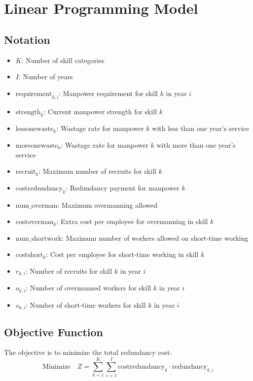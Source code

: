 \documentclass{article}
\begin{document}
\section*{Linear Programming Model}

\subsection*{Notation}
\begin{itemize}
    \item \( K \): Number of skill categories
    \item \( I \): Number of years
    \item \( \text{requirement}_{k,i} \): Manpower requirement for skill \( k \) in year \( i \)
    \item \( \text{strength}_{k} \): Current manpower strength for skill \( k \)
    \item \( \text{lessonewaste}_{k} \): Wastage rate for manpower \( k \) with less than one year's service
    \item \( \text{moreonewaste}_{k} \): Wastage rate for manpower \( k \) with more than one year's service
    \item \( \text{recruit}_{k} \): Maximum number of recruits for skill \( k \)
    \item \( \text{costredundancy}_{k} \): Redundancy payment for manpower \( k \)
    \item \( \text{num\_overman} \): Maximum overmanning allowed
    \item \( \text{costoverman}_{k} \): Extra cost per employee for overmanning in skill \( k \)
    \item \( \text{num\_shortwork} \): Maximum number of workers allowed on short-time working
    \item \( \text{costshort}_{k} \): Cost per employee for short-time working in skill \( k \)
    
    \item \( r_{k,i} \): Number of recruits for skill \( k \) in year \( i \)
    \item \( o_{k,i} \): Number of overmanned workers for skill \( k \) in year \( i \)
    \item \( s_{k,i} \): Number of short-time workers for skill \( k \) in year \( i \)
\end{itemize}

\subsection*{Objective Function}
The objective is to minimize the total redundancy cost:
\[
\text{Minimize} \quad Z = \sum_{k=1}^{K} \sum_{i=1}^{I} \text{costredundancy}_{k} \cdot \text{redundancy}_{k,i}
\]
\end{document}
